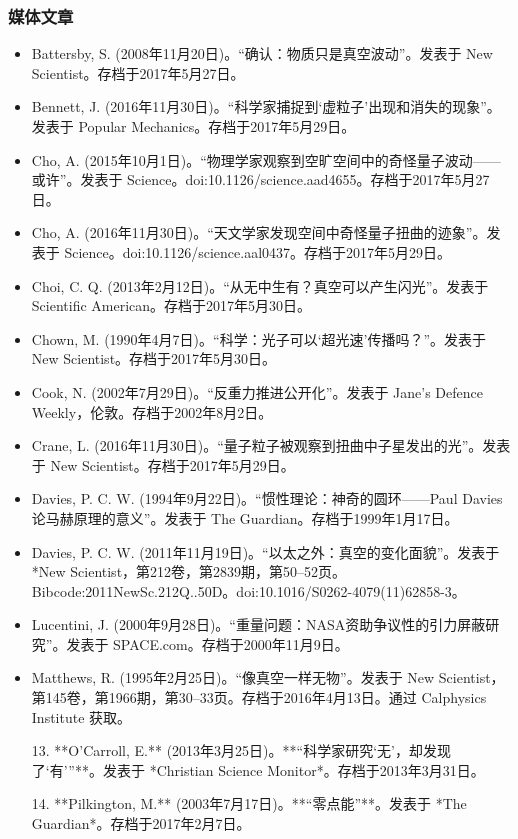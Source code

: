 \subsubsection{媒体文章}
\begin{itemize}
\item Battersby, S. (2008年11月20日)。“确认：物质只是真空波动”。发表于 New Scientist。存档于2017年5月27日。
\item Bennett, J. (2016年11月30日)。“科学家捕捉到‘虚粒子’出现和消失的现象”。发表于 Popular Mechanics。存档于2017年5月29日。
\item Cho, A. (2015年10月1日)。“物理学家观察到空旷空间中的奇怪量子波动——或许”。发表于 Science。doi:10.1126/science.aad4655。存档于2017年5月27日。
\item Cho, A. (2016年11月30日)。“天文学家发现空间中奇怪量子扭曲的迹象”。发表于 Science。doi:10.1126/science.aal0437。存档于2017年5月29日。
\item Choi, C. Q. (2013年2月12日)。“从无中生有？真空可以产生闪光”。发表于 Scientific American。存档于2017年5月30日。
\item Chown, M. (1990年4月7日)。“科学：光子可以‘超光速’传播吗？”。发表于 New Scientist。存档于2017年5月30日。
\item Cook, N. (2002年7月29日)。“反重力推进公开化”。发表于 Jane's Defence Weekly，伦敦。存档于2002年8月2日。
\item Crane, L. (2016年11月30日)。“量子粒子被观察到扭曲中子星发出的光”。发表于 New Scientist。存档于2017年5月29日。
\item Davies, P. C. W. (1994年9月22日)。“惯性理论：神奇的圆环——Paul Davies论马赫原理的意义”。发表于 The Guardian。存档于1999年1月17日。
\item Davies, P. C. W. (2011年11月19日)。“以太之外：真空的变化面貌”。发表于 *New Scientist，第212卷，第2839期，第50–52页。Bibcode:2011NewSc.212Q..50D。doi:10.1016/S0262-4079(11)62858-3。
\item Lucentini, J. (2000年9月28日)。“重量问题：NASA资助争议性的引力屏蔽研究”。发表于 SPACE.com。存档于2000年11月9日。
\item Matthews, R. (1995年2月25日)。“像真空一样无物”。发表于 New Scientist，第145卷，第1966期，第30–33页。存档于2016年4月13日。通过 Calphysics Institute 获取。

13. **O'Carroll, E.** (2013年3月25日)。**“科学家研究‘无’，却发现了‘有’”**。发表于 *Christian Science Monitor*。存档于2013年3月31日。

14. **Pilkington, M.** (2003年7月17日)。**“零点能”**。发表于 *The Guardian*。存档于2017年2月7日。


\end{itemize}
